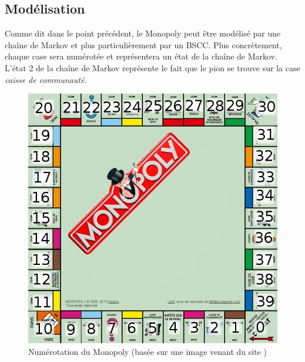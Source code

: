 \documentclass[letterpaper]{article}
\begin{document}
  \subsection{Modélisation}
    \label{modeliation_monopoly}
    Comme dit dans le point précédent, le Monopoly peut être modélisé par une chaîne de
    Markov et plus particulièrement par un BSCC.  Plus concrètement, chaque case sera 
    numérotée et représentera un état de la chaîne de Markov.  L'état 2 de la chaîne 
    de Markov représente le fait que le pion se trouve sur la case \textit{caisse de 
    communauté}.
    \begin{figure}[h]
      \centering
      \includegraphics[scale=0.4]{./Images/Monopoly.png}
	\caption{Numérotation du Monopoly (basée sur une image venant du site 
	\cite{IMG_Monopoly})}
    \end{figure}
    
\end{document}
